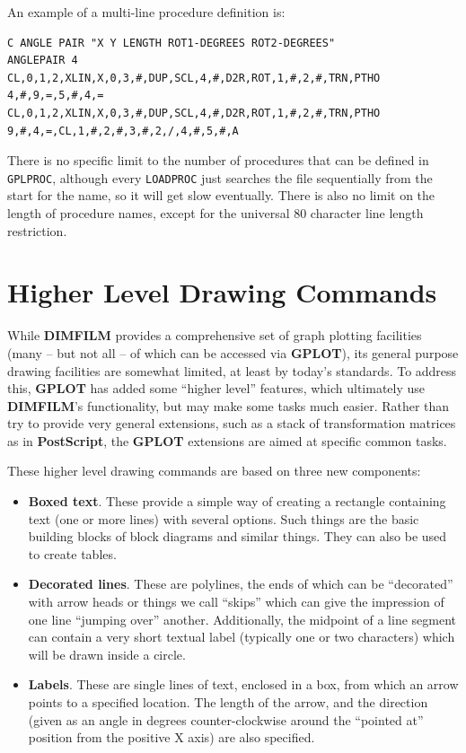 \documentclass[a4paper,twoside,11pt]{article}
\newcommand{\newpara}{\par\vspace{4mm}\noindent}
\begin{document}
\newpara
An example of a multi-line procedure definition is:
\begin{lstlisting}
C ANGLE PAIR "X Y LENGTH ROT1-DEGREES ROT2-DEGREES"
ANGLEPAIR 4
CL,0,1,2,XLIN,X,0,3,#,DUP,SCL,4,#,D2R,ROT,1,#,2,#,TRN,PTHO
4,#,9,=,5,#,4,=
CL,0,1,2,XLIN,X,0,3,#,DUP,SCL,4,#,D2R,ROT,1,#,2,#,TRN,PTHO
9,#,4,=,CL,1,#,2,#,3,#,2,/,4,#,5,#,A
\end{lstlisting}

\newpara
There is no specific limit to the number of procedures that can be defined in \texttt{GPLPROC},
although every \texttt{LOADPROC} just searches the file sequentially from the start for the name,
so it will get slow eventually. There is also no limit on the length of procedure names,
except for the universal 80 character line length restriction.


\section{Higher Level Drawing Commands}
\newpara
While \textbf{DIMFILM} provides a comprehensive set of graph plotting facilities (many -- but not all -- of which can
be accessed via \textbf{GPLOT}), its general purpose drawing facilities are somewhat limited, at least by today's
standards. To address this, \textbf{GPLOT} has added some ``higher level'' features, which ultimately use \textbf{DIMFILM}'s
functionality, but may make some tasks much easier. Rather than try to provide very general extensions, such as a stack
of transformation matrices as in \textbf{PostScript}, the \textbf{GPLOT} extensions are aimed at specific common tasks.

\newpara
These higher level drawing commands are based on three new components:
\begin{itemize}
\item \textbf{Boxed text}. These provide a simple way of creating a rectangle containing text (one or more
  lines) with several options. Such things are the basic building blocks of block diagrams and similar things.
  They can also be used to create tables.
\item \textbf{Decorated lines}. These are polylines, the ends of which can be ``decorated'' with arrow heads or things
  we call ``skips'' which can give the impression of one line ``jumping over'' another. Additionally, the
  midpoint of a line segment can contain a very short textual label (typically one or two characters) which
  will be drawn inside a circle.
\item \textbf{Labels}. These are single lines of text, enclosed in a box, from which an arrow points to a specified
  location. The length of the arrow, and the direction (given as an angle in degrees counter-clockwise
  around the ``pointed at'' position from the positive X axis)
  are also specified.
\end{itemize}
\end{document}
